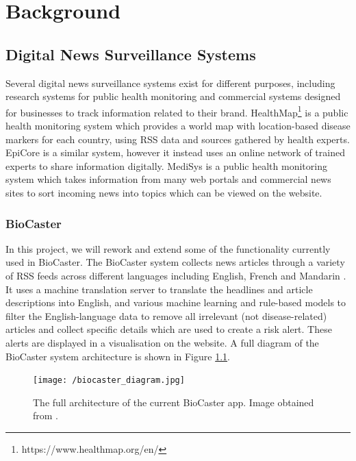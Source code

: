 \documentclass{l4proj}
\begin{document}
\chapter{Background}
\section{Digital News Surveillance Systems}

Several digital news surveillance systems exist for different purposes, including research systems for public health monitoring and commercial systems designed for businesses to track information related to their brand. HealthMap\footnote{https://www.healthmap.org/en/} is a public health monitoring system which provides a world map with location-based disease markers for each country, using RSS data and sources gathered by health experts. EpiCore \citep{haddad2016epicore} is a similar system, however it instead uses an online network of trained experts to share information digitally. MediSys \citep{steinberger2008medisys} is a public health monitoring system which takes information from many web portals and commercial news sites to sort incoming news into topics which can be viewed on the website. \par

\subsection{BioCaster}
In this project, we will rework and extend some of the functionality currently used in BioCaster. The BioCaster system collects news articles through a variety of RSS feeds across different languages including English, French and Mandarin \citep{collier2008biocaster}. It uses a machine translation server to translate the headlines and article descriptions into English, and various machine learning and rule-based models to filter the English-language data to remove all irrelevant (not disease-related) articles and collect specific details which are used to create a risk alert. These alerts are displayed in a visualisation on the website. A full diagram of the BioCaster system architecture is shown in Figure \ref{fig:biocaster_architecture}. 

 \begin{figure}[h]
 \centering
\texttt{[image: /biocaster\_diagram.jpg]}
\caption{The full architecture of the current BioCaster app. Image obtained from \cite{meng2022biocaster}.}
\label{fig:biocaster_architecture}
\end{figure}
\par
\end{document}
